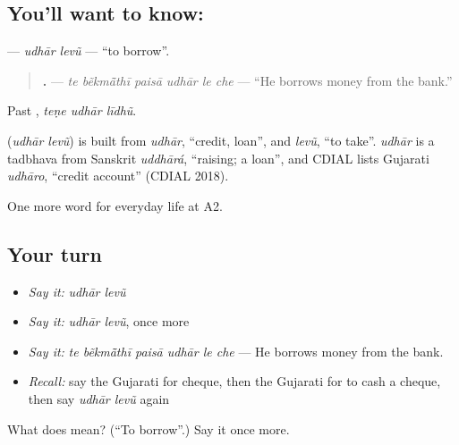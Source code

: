 \subsection*{You'll want to know:  }
\textbf{ } — \emph{udhār levũ} — \textquotedblleft{}to borrow\textquotedblright{}.

\begin{quote}
\textbf{     .} — \emph{te bẽkmā̃thī paisā udhār le che} — \textquotedblleft{}He borrows money from the bank.\textquotedblright{}
\end{quote}

Past \textbf{  }, \emph{teṇe udhār līdhũ}.

\begin{cousinweb}
\textbf{ } (\emph{udhār levũ}) is built from \emph{udhār}, \textquotedblleft{}credit, loan\textquotedblright{}, and \emph{levũ}, \textquotedblleft{}to take\textquotedblright{}. \emph{udhār} is a tadbhava from Sanskrit \emph{uddhārá}, \textquotedblleft{}raising; a loan\textquotedblright{}, and CDIAL lists Gujarati \emph{udhāro}, \textquotedblleft{}credit account\textquotedblright{} (CDIAL 2018).
\end{cousinweb}

\begin{grammarlens}[title={What you've built}]
One more word for everyday life at A2.
\end{grammarlens}

\subsection*{Your turn}
\begin{itemize}
\raggedright
  \item \emph{Say it:} \emph{udhār levũ}
  \item \emph{Say it:} \emph{udhār levũ}, once more
  \item \emph{Say it:} \emph{te bẽkmā̃thī paisā udhār le che} — He borrows money from the bank.
  \item \emph{Recall:} say the Gujarati for cheque, then the Gujarati for to cash a cheque, then say \emph{udhār levũ} again
\end{itemize}

\begin{tcolorbox}[breakable,colback=teal!4,colframe=teal!35!black,title={Before you move on}]
What does   mean? (\textquotedblleft{}To borrow\textquotedblright{}.) Say it once more.
\end{tcolorbox}
